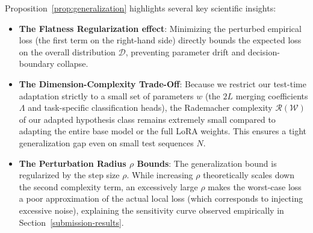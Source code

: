 \documentclass{article}
\theoremstyle{plain}
\theoremstyle{definition}
\theoremstyle{remark}
\begin{document}
Proposition~\ref{prop:generalization} highlights several key scientific insights:
\begin{itemize}
  \item \textbf{The Flatness Regularization effect}: Minimizing the perturbed empirical loss (the first term on the right-hand side) directly bounds the expected loss on the overall distribution $\mathcal{D}$, preventing parameter drift and decision-boundary collapse.
  \item \textbf{The Dimension-Complexity Trade-Off}: Because we restrict our test-time adaptation strictly to a small set of parameters $w$ (the $2L$ merging coefficients $\Lambda$ and task-specific classification heads), the Rademacher complexity $\mathcal{R}(\mathcal{W})$ of our adapted hypothesis class remains extremely small compared to adapting the entire base model or the full LoRA weights. This ensures a tight generalization gap even on small test sequences $N$.
  \item \textbf{The Perturbation Radius $\rho$ Bounds}: The generalization bound is regularized by the step size $\rho$. While increasing $\rho$ theoretically scales down the second complexity term, an excessively large $\rho$ makes the worst-case loss a poor approximation of the actual local loss (which corresponds to injecting excessive noise), explaining the sensitivity curve observed empirically in Section~\ref{submission-results}.
\end{itemize}
\end{document}
